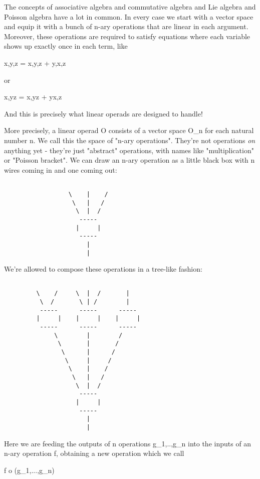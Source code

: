 The concepts of associative algebra and commutative algebra and Lie
algebra and Poisson algebra have a lot in common.  In every case we
start with a vector space and equip it with a bunch of n-ary
operations that are linear in each argument.  Moreover, these
operations are required to satisfy equations where each variable shows
up exactly once in each term, like

{x,{y,z}} = {{x,y},z} + {y,{x,z}}

or 

{x,yz} = {x,y}z + y{x,z}

And this is precisely what linear operads are designed to handle!

More precisely, a linear operad O consists of a vector space O_{n} for
each natural number n.  We call this the space of "n-ary operations".
They're not operations \emph{on} anything yet - they're just
"abstract" operations, with names like
"multiplication" or "Poisson bracket".  We can
draw an n-ary operation as a little black box with n wires coming in
and one coming out:


\begin{verbatim}

                  \    |    /
                   \   |   / 
                    \  |  /
                     -----
                    |     | 
                     -----
                       |
                       |
\end{verbatim}
    
We're allowed to compose these operations in a tree-like fashion:


\begin{verbatim}

         \    /     \  |  /       | 
          \  /       \ | /        |
          -----      -----      -----
         |     |    |     |    |     |
          -----      -----      -----
              \        |        /  
               \       |       /
                \      |      /
                 \     |     /
                  \    |    / 
                   \   |   /  
                    \  |  /
                     -----
                    |     | 
                     -----
                       |
                       |
\end{verbatim}
    

Here we are feeding the outputs of n operations
g_{1},..,g_{n} into the inputs of an n-ary operation
f, obtaining a new operation which we call

f o (g_{1},...,g_{n})

